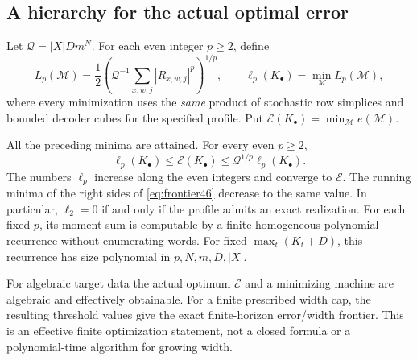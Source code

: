 \subsection{A hierarchy for the actual optimal error}
Let $\mathcal Q=|X|Dm^N$. For each even integer $p\ge2$, define
\begin{equation}\label{eq:momnorm46}
 L_p(\mathcal M)=\frac12
       \left(\mathcal Q^{-1}\sum_{x,w,j}|R_{x,w,j}|^{p}\right)^{1/p},\qquad
 \ell_p(K_\bullet)=\min_{\mathcal M}L_p(\mathcal M),
\end{equation}
where every minimization uses the \emph{same} product of stochastic row
simplices and bounded decoder cubes for the specified profile. Put
$\mathcal E(K_\bullet)=\min_{\mathcal M}e(\mathcal M)$.

\begin{theorem}\label{thm:moments46}
All the preceding minima are attained. For every even $p\ge2$,
\begin{equation}\label{eq:frontier46}
 \ell_p(K_\bullet)\le\mathcal E(K_\bullet)
                 \le \mathcal Q^{1/p}\ell_p(K_\bullet).
\end{equation}
The numbers $\ell_p$ increase along the even integers and converge to
$\mathcal E$. The running minima of the right sides of
\eqref{eq:frontier46} decrease to the same value. In particular,
$\ell_2=0$ if and only if the profile admits an exact realization.
For each fixed $p$, its moment sum is computable by a finite homogeneous
polynomial recurrence without enumerating words. For fixed
$\max_t(K_t+D)$, this recurrence has size polynomial in $p,N,m,D,|X|$.

For algebraic target data the actual optimum $\mathcal E$ and a
minimizing machine are algebraic and effectively obtainable. For a
finite prescribed width cap, the resulting threshold values give the
exact finite-horizon error/width frontier. This is an effective finite
optimization statement, not a closed formula or a polynomial-time
algorithm for growing width.
\end{theorem}
